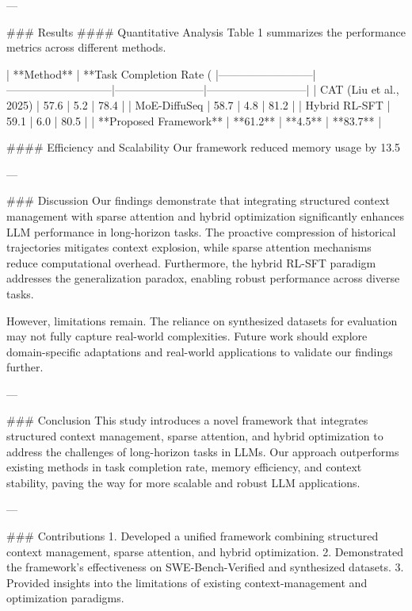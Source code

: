 ---

### Results  
#### Quantitative Analysis  
Table 1 summarizes the performance metrics across different methods.

| **Method**              | **Task Completion Rate (%
|--------------------------|-----------------------------|------------------------|---------------------------|  
| CAT (Liu et al., 2025)   | 57.6                       | 5.2                    | 78.4                      |  
| MoE-DiffuSeq             | 58.7                       | 4.8                    | 81.2                      |  
| Hybrid RL-SFT            | 59.1                       | 6.0                    | 80.5                      |  
| **Proposed Framework**   | **61.2**                   | **4.5**                | **83.7**                  |  

#### Efficiency and Scalability  
Our framework reduced memory usage by 13.5%

---

### Discussion  
Our findings demonstrate that integrating structured context management with sparse attention and hybrid optimization significantly enhances LLM performance in long-horizon tasks. The proactive compression of historical trajectories mitigates context explosion, while sparse attention mechanisms reduce computational overhead. Furthermore, the hybrid RL-SFT paradigm addresses the generalization paradox, enabling robust performance across diverse tasks.

However, limitations remain. The reliance on synthesized datasets for evaluation may not fully capture real-world complexities. Future work should explore domain-specific adaptations and real-world applications to validate our findings further.

---

### Conclusion  
This study introduces a novel framework that integrates structured context management, sparse attention, and hybrid optimization to address the challenges of long-horizon tasks in LLMs. Our approach outperforms existing methods in task completion rate, memory efficiency, and context stability, paving the way for more scalable and robust LLM applications.

---

### Contributions  
1. Developed a unified framework combining structured context management, sparse attention, and hybrid optimization.  
2. Demonstrated the framework's effectiveness on SWE-Bench-Verified and synthesized datasets.  
3. Provided insights into the limitations of existing context-management and optimization paradigms.